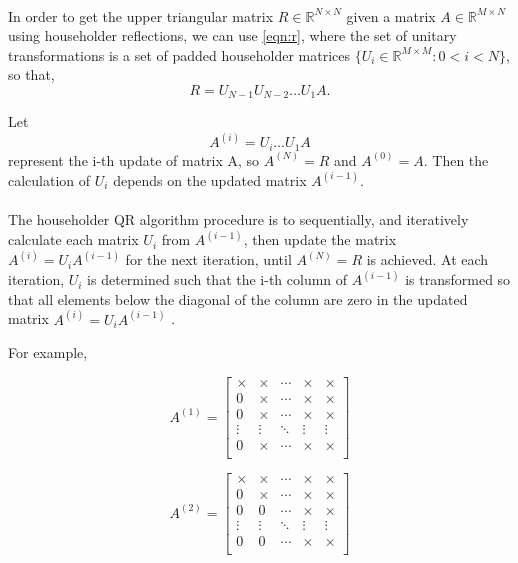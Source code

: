 \documentclass{article}
\begin{document}
\paragraph{}
In order to get the upper triangular matrix $R \in\mathbb{R}^{N\times{}N}$ given a matrix $A \in\mathbb{R}^{M\times{}N}$ using householder reflections, we can use \eqref{eqn:r}, where the set of unitary transformations is a set of padded householder matrices $\{U_i\in\mathbb{R}^{M\times{}M} : 0 < i < N\}$, so that,
\begin{equation}
R = U_{N-1} U_{N-2} \dots U_1A.
\end{equation}

Let 
\begin{equation}
A^{(i)}=U_{i} \dots U_1A
\end{equation}
represent the i-th update of matrix A, so $A^{(N)}=R$ and $A^{(0)} = A$. Then the calculation of $U_i$ depends on the updated matrix $A^{(i-1)}$.
\paragraph{}
The householder QR algorithm procedure is to sequentially, and iteratively calculate each matrix $U_i$ from $A^{(i-1)}$, then update the matrix $A^{(i)} = U_iA^{(i-1)}$ for the next iteration, until $A^{(N)}=R$ is achieved. At each iteration, $U_i$ is determined such that the i-th column of $A^{(i-1)}$ is transformed so that all elements below the diagonal of the column are zero in the updated matrix $A^{(i)} = U_iA^{(i-1)}$ \cite{golub} \cite{doi:10.1137/19M1296367}.

For example,

\begin{equation}
A^{(1)} =
\begin{bmatrix}
\times & \times & \cdots & \times & \times\\
0 & \times  & \cdots & \times & \times\\
0 & \times  & \cdots & \times & \times\\
\vdots & \vdots  & \ddots & \vdots & \vdots\\
0 & \times  & \cdots & \times & \times\\
\end{bmatrix}
\end{equation}

\begin{equation}
A^{(2)} =
\begin{bmatrix}
\times & \times & \cdots & \times & \times\\
0 & \times  & \cdots & \times & \times\\
0 & 0 & \cdots & \times & \times\\
\vdots & \vdots  & \ddots & \vdots & \vdots\\
0 & 0  & \cdots & \times & \times\\
\end{bmatrix}
\end{equation}
\end{document}

